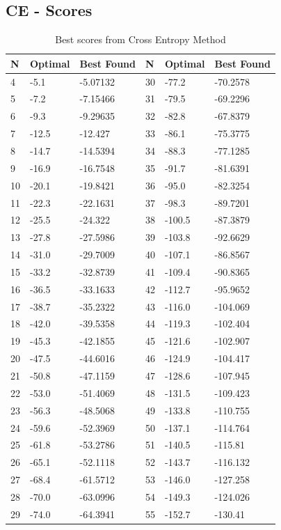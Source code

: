 \documentclass[conference,letterpaper]{IEEEtran}
\begin{document}
\subsection{CE - Scores}
\begin{table}[!ht]
    \begin{tabularx}{\columnwidth}{XXXXXX}
    N  & Optimal & Best Found & N  & Optimal & Best Found \\ \hline
    4  & -5.1    & -5.07132   & 30 & -77.2   & -70.2578   \\
    5  & -7.2    & -7.15466   & 31 & -79.5   & -69.2296   \\
    6  & -9.3    & -9.29635   & 32 & -82.8   & -67.8379   \\
    7  & -12.5   & -12.427    & 33 & -86.1   & -75.3775   \\
    8  & -14.7   & -14.5394   & 34 & -88.3   & -77.1285   \\
    9  & -16.9   & -16.7548   & 35 & -91.7   & -81.6391   \\
    10 & -20.1   & -19.8421   & 36 & -95.0   & -82.3254   \\
    11 & -22.3   & -22.1631   & 37 & -98.3   & -89.7201   \\
    12 & -25.5   & -24.322    & 38 & -100.5  & -87.3879   \\
    13 & -27.8   & -27.5986   & 39 & -103.8  & -92.6629   \\
    14 & -31.0   & -29.7009   & 40 & -107.1  & -86.8567   \\
    15 & -33.2   & -32.8739   & 41 & -109.4  & -90.8365   \\
    16 & -36.5   & -33.1633   & 42 & -112.7  & -95.9652   \\
    17 & -38.7   & -35.2322   & 43 & -116.0  & -104.069   \\
    18 & -42.0   & -39.5358   & 44 & -119.3  & -102.404   \\
    19 & -45.3   & -42.1855   & 45 & -121.6  & -102.907   \\
    20 & -47.5   & -44.6016   & 46 & -124.9  & -104.417   \\
    21 & -50.8   & -47.1159   & 47 & -128.6  & -107.945   \\
    22 & -53.0   & -51.4069   & 48 & -131.5  & -109.423   \\
    23 & -56.3   & -48.5068   & 49 & -133.8  & -110.755   \\
    24 & -59.6   & -52.3969   & 50 & -137.1  & -114.764   \\
    25 & -61.8   & -53.2786   & 51 & -140.5  & -115.81    \\
    26 & -65.1   & -52.1118   & 52 & -143.7  & -116.132   \\
    27 & -68.4   & -61.5712   & 53 & -146.0  & -127.258   \\
    28 & -70.0   & -63.0996   & 54 & -149.3  & -124.026   \\
    29 & -74.0   & -64.3941   & 55 & -152.7  & -130.41    \\ \hline
    \end{tabularx}
    \caption{Best scores from Cross Entropy Method}
    \label{CE_Results}
\end{table}
\end{document}
